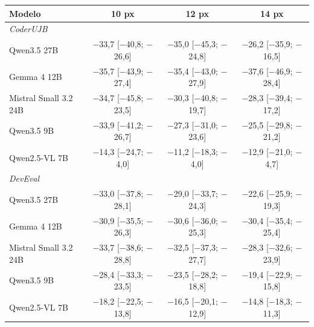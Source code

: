 \begin{tabular}{lccc}
\toprule
Modelo & 10 px & 12 px & 14 px \\
\midrule
\multicolumn{4}{l}{\emph{CoderUJB}} \\
Qwen3.5 27B & \ensuremath{-}33,7 [\ensuremath{-}40,8; \ensuremath{-}26,6] & \ensuremath{-}35,0 [\ensuremath{-}45,3; \ensuremath{-}24,8] & \ensuremath{-}26,2 [\ensuremath{-}35,9; \ensuremath{-}16,5] \\
Gemma 4 12B & \ensuremath{-}35,7 [\ensuremath{-}43,9; \ensuremath{-}27,4] & \ensuremath{-}35,4 [\ensuremath{-}43,0; \ensuremath{-}27,9] & \ensuremath{-}37,6 [\ensuremath{-}46,9; \ensuremath{-}28,4] \\
Mistral Small 3.2 24B & \ensuremath{-}34,7 [\ensuremath{-}45,8; \ensuremath{-}23,5] & \ensuremath{-}30,3 [\ensuremath{-}40,8; \ensuremath{-}19,7] & \ensuremath{-}28,3 [\ensuremath{-}39,4; \ensuremath{-}17,2] \\
Qwen3.5 9B & \ensuremath{-}33,9 [\ensuremath{-}41,2; \ensuremath{-}26,7] & \ensuremath{-}27,3 [\ensuremath{-}31,0; \ensuremath{-}23,6] & \ensuremath{-}25,5 [\ensuremath{-}29,8; \ensuremath{-}21,2] \\
Qwen2.5-VL 7B & \ensuremath{-}14,3 [\ensuremath{-}24,7; \ensuremath{-}4,0] & \ensuremath{-}11,2 [\ensuremath{-}18,3; \ensuremath{-}4,0] & \ensuremath{-}12,9 [\ensuremath{-}21,0; \ensuremath{-}4,7] \\
\midrule
\multicolumn{4}{l}{\emph{DevEval}} \\
Qwen3.5 27B & \ensuremath{-}33,0 [\ensuremath{-}37,8; \ensuremath{-}28,1] & \ensuremath{-}29,0 [\ensuremath{-}33,7; \ensuremath{-}24,3] & \ensuremath{-}22,6 [\ensuremath{-}25,9; \ensuremath{-}19,3] \\
Gemma 4 12B & \ensuremath{-}30,9 [\ensuremath{-}35,5; \ensuremath{-}26,3] & \ensuremath{-}30,6 [\ensuremath{-}36,0; \ensuremath{-}25,3] & \ensuremath{-}30,4 [\ensuremath{-}35,4; \ensuremath{-}25,4] \\
Mistral Small 3.2 24B & \ensuremath{-}33,7 [\ensuremath{-}38,6; \ensuremath{-}28,8] & \ensuremath{-}32,5 [\ensuremath{-}37,3; \ensuremath{-}27,7] & \ensuremath{-}28,3 [\ensuremath{-}32,6; \ensuremath{-}23,9] \\
Qwen3.5 9B & \ensuremath{-}28,4 [\ensuremath{-}33,3; \ensuremath{-}23,5] & \ensuremath{-}23,5 [\ensuremath{-}28,2; \ensuremath{-}18,8] & \ensuremath{-}19,4 [\ensuremath{-}22,9; \ensuremath{-}15,8] \\
Qwen2.5-VL 7B & \ensuremath{-}18,2 [\ensuremath{-}22,5; \ensuremath{-}13,8] & \ensuremath{-}16,5 [\ensuremath{-}20,1; \ensuremath{-}12,9] & \ensuremath{-}14,8 [\ensuremath{-}18,3; \ensuremath{-}11,3] \\
\bottomrule
\end{tabular}
